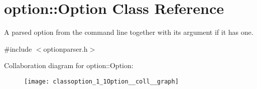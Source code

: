 \hypertarget{classoption_1_1Option}{}\section{option\+:\+:Option Class Reference}
\label{classoption_1_1Option}


A parsed option from the command line together with its argument if it has one.  




{\ttfamily \#include $<$optionparser.\+h$>$}



Collaboration diagram for option\+:\+:Option\+:
\nopagebreak
\begin{figure}[H]
\begin{center}
\leavevmode
\texttt{[image: classoption\_1\_1Option\_\_coll\_\_graph]}
\end{center}
\end{figure}
